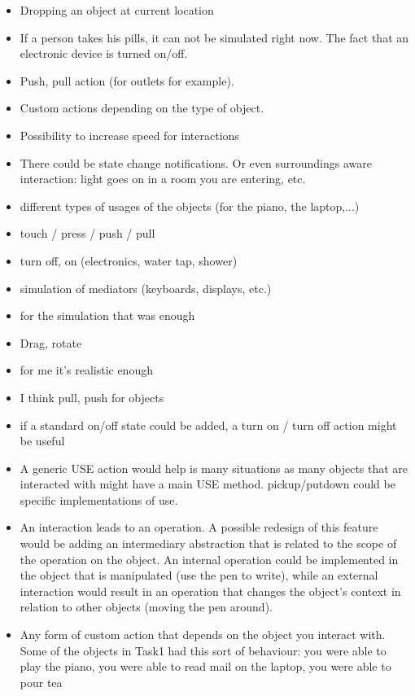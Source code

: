 \begin{itemize}
	\item Dropping an object at current location
	\item If a person takes his pills, it can not be simulated right now. The fact that an electronic device is turned on/off.
	\item Push, pull action (for outlets for example).
	\item Custom actions depending on the type of object.
	\item Possibility to increase speed for interactions
	\item There could be state change notifications. Or even surroundings aware interaction: light goes on in a room you are entering, etc.
	\item different types of usages of the objects (for the piano, the laptop,...)
	\item touch / press / push / pull
	\item turn off, on (electronics, water tap, shower)
	\item simulation of mediators (keyboards, displays, etc.)
	\item for the simulation that was enough
	\item Drag, rotate
	\item for me it's realistic enough
	\item I think pull, push for objects
	\item if a standard on/off state could be added, a turn on / turn off action might be useful
	\item A generic USE action would help is many situations as many objects that are interacted with might have a main USE method. pickup/putdown could be specific implementations of use.
	\item An interaction leads to an operation. A possible redesign of this feature would be adding an intermediary abstraction that is related to the scope of the operation on the object. An internal operation could be implemented in the object that is manipulated (use the pen to write), while an external interaction would result in an operation that changes the object's context in relation to other objects (moving the pen around).
	\item Any form of custom action that depends on the object you interact with. Some of the objects in Task1 had this sort of behaviour: you were able to play the piano, you were able to read mail on the laptop, you were able to pour tea
\end{itemize}

